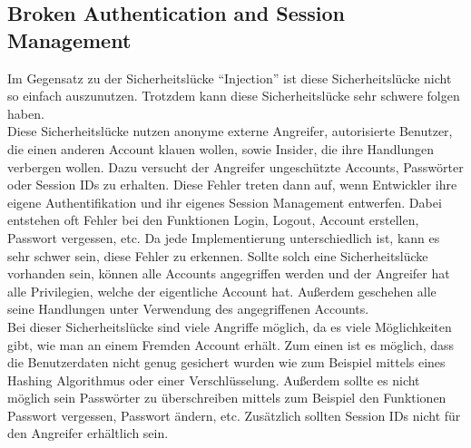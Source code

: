 \subsection{Broken Authentication and Session Management}
Im Gegensatz zu der Sicherheitslücke \enquote{Injection} ist diese Sicherheitslücke nicht so einfach auszunutzen. Trotzdem kann diese Sicherheitslücke sehr schwere folgen haben. \\
Diese Sicherheitslücke nutzen anonyme externe Angreifer, autorisierte Benutzer, die einen anderen Account klauen wollen, sowie Insider, die ihre Handlungen verbergen wollen. Dazu versucht der Angreifer ungeschützte Accounts, Passwörter oder Session IDs zu erhalten. Diese Fehler treten dann auf, wenn Entwickler ihre eigene Authentifikation und ihr eigenes Session Management entwerfen. Dabei entstehen oft Fehler bei den Funktionen Login, Logout, Account erstellen, Passwort vergessen, etc. Da jede Implementierung unterschiedlich ist, kann es sehr schwer sein, diese Fehler zu erkennen. Sollte solch eine Sicherheitslücke vorhanden sein, können alle Accounts angegriffen werden und der Angreifer hat alle Privilegien, welche der eigentliche Account hat. Außerdem geschehen alle seine Handlungen unter Verwendung des angegriffenen Accounts. \\
Bei dieser Sicherheitslücke sind viele Angriffe möglich, da es viele Möglichkeiten gibt, wie man an einem Fremden Account erhält. Zum einen ist es möglich, dass die Benutzerdaten nicht genug gesichert wurden wie zum Beispiel mittels eines Hashing Algorithmus oder einer Verschlüsselung. Außerdem sollte es nicht möglich sein Passwörter zu überschreiben mittels zum Beispiel den Funktionen Passwort vergessen, Passwort ändern, etc. Zusätzlich sollten Session IDs nicht für den Angreifer erhältlich sein.
